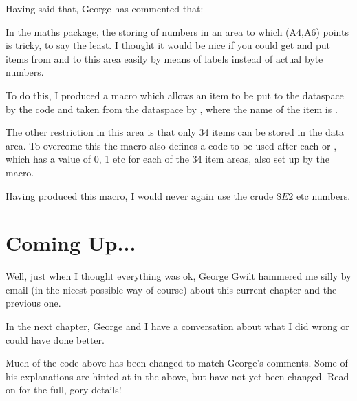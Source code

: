 Having said that, George has commented that:

\begin{note}
In the maths package, the storing of numbers in an area to which (A4,A6) points is tricky, to say the least. I thought it would be nice if you could get and put items from and to this area easily by means of labels instead of actual byte numbers.

To do this, I produced a macro which allows an item to be put to the dataspace by the code  and taken from the dataspace by , where the name of the item is .

The other restriction in this area is that only 34 items can be stored in the data area. To overcome this the macro also defines a code to be used after each  or , which has a value of 0, 1 etc for each of the 34 item areas, also set up by the macro.

Having produced this macro, I would never again use the crude $\$E2$ etc numbers.
\end{note}


\section{Coming Up...}
\label{ch16-the-end}%

Well, just when I thought everything was ok, George Gwilt hammered
    me silly by email (in the nicest possible way of course) about this current chapter and
    the previous one. 
    
In the next chapter, George and I have a conversation
    about what I did wrong or could have done better.

Much of the code above has been changed to match George's comments.
    Some of his explanations are hinted at in the above, but have not yet been
    changed. Read on for the full, gory details!

